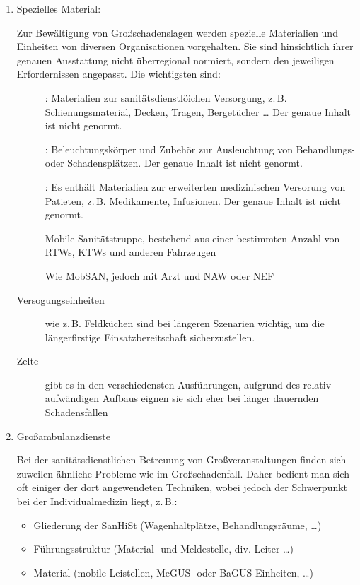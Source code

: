 \documentclass[
ngerman,
paper=a4,
asymmetric,
fontsize=10pt,
headings=small,
draft=false,
numbers=noenddot,
bibtotocnumbered,
footnotes=multiple,
toc=flat,
]{scrreprt}
\newcommand{\Neu}{\fontfamily{lmtt}\fontseries{lc}\selectfont\color{DarkGreen}}
\begin{document}
\begin{enumerate}
{\begin{PictureSeriesWide}{}{Zivilschutz-Sirenensignale in
Österreich\label{fig:zvivilschutz-sirenensignale-at}}
\end{PictureSeriesWide}
    }
\item Spezielles Material:

{\Neu Zur Bewältigung von Großschadenslagen werden spezielle
Materialien und Einheiten von diversen Organisationen
vorgehalten. Sie sind hinsichtlich ihrer genauen Ausstattung
nicht überregional normiert, sondern den jeweiligen
Erfordernissen angepasst. Die wichtigsten sind:

\begin{description}
  \item[] : Materialien zur
  sanitätsdienstlöichen Versorgung, z.\,B.
  Schienungsmaterial, Decken, Tragen, Bergetücher {\ldots} Der genaue
  Inhalt ist nicht genormt. 
  \item[] :
  Beleuchtungskörper und Zubehör zur Ausleuchtung von
  Behandlungs- oder Schadensplätzen. Der genaue
  Inhalt ist nicht genormt.
  \item[] : Es
  enthält Materialien zur erweiterten medizinischen Versorung von
  Patieten, z.\,B. Medikamente, Infusionen. Der genaue
  Inhalt ist nicht genormt.
  \item[] Mobile Sanitätstruppe, bestehend aus
  einer bestimmten Anzahl von RTWs, KTWs und anderen Fahrzeugen
  \item[] Wie MobSAN, jedoch mit Arzt und NAW
  oder NEF
  \item[Versogungseinheiten] wie z.\,B. Feldküchen sind bei
  längeren Szenarien wichtig, um die längerfirstige
  Einsatzbereitschaft sicherzustellen. 
  \item[Zelte] gibt es in den verschiedensten Ausführungen,
  aufgrund des relativ aufwändigen Aufbaus eignen sie sich
  eher bei länger dauernden Schadensfällen
\end{description}
}
\item Großambulanzdienste

{\Neu Bei der sanitätsdienstlichen Betreuung von
Großveranstaltungen finden sich zuweilen ähnliche Probleme
wie im Großschadenfall. Daher bedient man sich oft einiger
der dort angewendeten Techniken, wobei jedoch der
Schwerpunkt bei der Individualmedizin liegt, z.\,B.:

\begin{itemize}
  \item Gliederung der SanHiSt (Wagenhaltplätze,
  Behandlungsräume, \ldots)
  \item Führungsstruktur (Material- und Meldestelle, div.
  Leiter \ldots)
  \item Material (mobile Leistellen, MeGUS- oder
  BaGUS-Einheiten, \ldots)
\end{itemize}
 
}
\end{enumerate}
\end{document}
